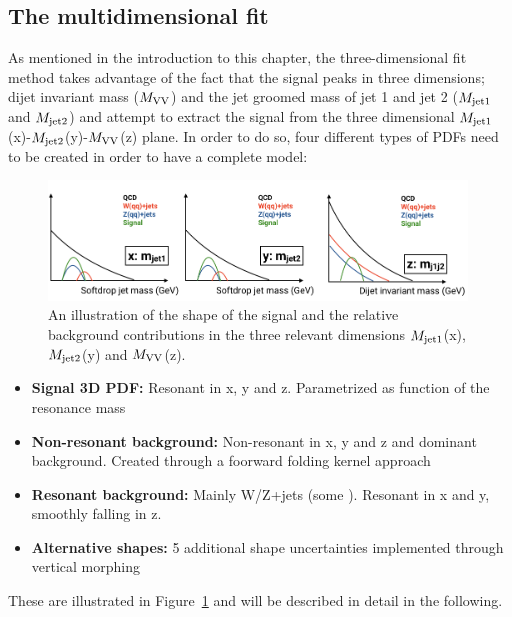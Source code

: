 \subsection{The multidimensional fit}
As mentioned in the introduction to this chapter, the three-dimensional fit method takes advantage of the fact that the signal peaks in three dimensions; dijet invariant mass ($M_{\rm VV}$) and the jet groomed mass of jet 1 and jet 2 ($M_{\rm jet1}$ and $M_{\rm jet2}$) and attempt to extract the signal from the three dimensional $M_{\rm jet1}$(x)-$M_{\rm jet2}$(y)-$M_{\rm VV}$(z) plane.
In order to do so, four different types of PDFs need to be created in order to have a complete model:
\begin{figure}[h!]
\centering
\includegraphics[width=0.99\textwidth]{figures/analysis/search3/misc/3Dfit.png}
\caption{An illustration of the shape of the signal and the relative background contributions in the three relevant dimensions $M_{\rm jet1}$(x), $M_{\rm jet2}$(y) and $M_{\rm VV}$(z). }
\label{fig:searchIII:3Dfit}
\end{figure}
\begin{itemize}
  \item \textbf{Signal 3D PDF:} Resonant in x, y and z. Parametrized as function of the resonance mass \mX
  \item \textbf{Non-resonant background:} Non-resonant in x, y and z and dominant background. Created through a foorward folding kernel approach
  \item \textbf{Resonant background:} Mainly W/Z+jets (some \ttbar). Resonant in x and y, smoothly falling in z.
  \item \textbf{Alternative shapes:} 5 additional shape uncertainties implemented through vertical morphing  
\end{itemize}
These are illustrated in Figure~\ref{fig:searchIII:3Dfit} and will be described in detail in the following.

